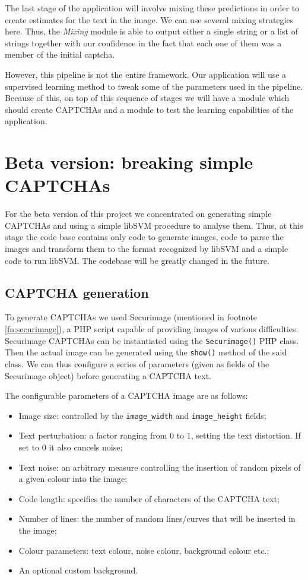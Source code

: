 \documentclass[a4paper,12pt]{article}
\begin{document}
The last stage of the application will involve mixing these predictions in
order to create estimates for the text in the image. We can use several mixing
strategies here. Thus, the \textit{Mixing} module is able to output either a
single string or a list of strings together with our confidence in the fact
that each one of them was a member of the initial captcha.

However, this pipeline is not the entire framework. Our application will use a
supervised learning method to tweak some of the parameters used in the
pipeline. Because of this, on top of this sequence of stages we will have a
module which should create CAPTCHAs and a module to test the learning
capabilities of the application.

\section{Beta version: breaking simple CAPTCHAs}
\label{sec:beta}

For the beta version of this project we concentrated on generating simple
CAPTCHAs and using a simple libSVM procedure to analyse them. Thus, at this
stage the code base contains only code to generate images, code to parse the
images and transform them to the format recognized by libSVM and a simple code
to run libSVM. The codebase will be greatly changed in the future.

\subsection*{CAPTCHA generation}

To generate CAPTCHAs we used Securimage (mentioned in footnote
\ref{fn:securimage}), a PHP script capable of providing images of
various difficulties. Securimage CAPTCHAs can be instantiated using
the \texttt{Securimage()} PHP class. Then the actual image can be
generated using the \texttt{show()} method of the said class. We can
thus configure a series of parameters (given as fields of the Securimage
object) before generating a CAPTCHA text.

The configurable parameters of a CAPTCHA image are as follows:

\begin{itemize}
	\item Image size: controlled by the \texttt{image\_width} and
	\texttt{image\_height} fields;
	\item Text perturbation: a factor ranging from $0$ to $1$, setting the
	text distortion. If set to $0$ it also cancels noise;
	\item Text noise: an arbitrary measure controlling the insertion of
	random pixels of a given colour into the image;
	\item Code length: specifies the number of characters of the CAPTCHA
	text;
	\item Number of lines: the number of random lines/curves that will be
	inserted in the image;
	\item Colour parameters: text colour, noise colour, background colour etc.;
	\item An optional custom background.
\end{itemize}
\end{document}
